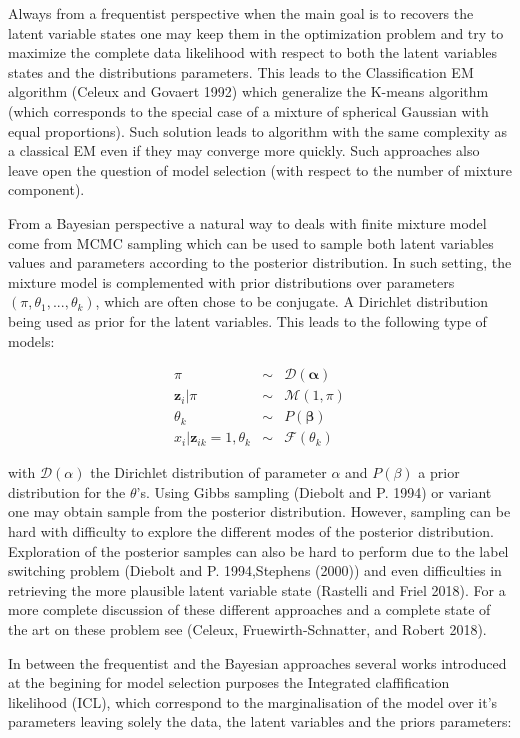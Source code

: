 \documentclass[]{article}
\begin{document}
Always from a frequentist perspective when the main goal is to recovers
the latent variable states one may keep them in the optimization problem
and try to maximize the complete data likelihood with respect to both
the latent variables states and the distributions parameters. This leads
to the Classification EM algorithm (Celeux and Govaert 1992) which
generalize the K-means algorithm (which corresponds to the special case
of a mixture of spherical Gaussian with equal proportions). Such
solution leads to algorithm with the same complexity as a classical EM
even if they may converge more quickly. Such approaches also leave open
the question of model selection (with respect to the number of mixture
component).

From a Bayesian perspective a natural way to deals with finite mixture
model come from MCMC sampling which can be used to sample both latent
variables values and parameters according to the posterior distribution.
In such setting, the mixture model is complemented with prior
distributions over parameters \((\pi,\theta_1,...,\theta_k)\), which are
often chose to be conjugate. A Dirichlet distribution being used as
prior for the latent variables. This leads to the following type of
models:

\[
\begin{eqnarray}
\pi&\sim& \mathcal{D}(\mathbf{\alpha})\\
\mathbf{z}_i|\pi&\sim& \mathcal{M}(1,\pi)\\
\theta_{k}&\sim& P(\mathbf{\beta})\\
x_i|\mathbf{z}_{ik}=1,\theta_k&\sim& \mathcal{F}(\theta_{k})
\end{eqnarray}
\]

with \(\mathcal{D}(\alpha)\) the Dirichlet distribution of parameter
\(\alpha\) and \(P(\beta)\) a prior distribution for the \(\theta\)'s.
Using Gibbs sampling (Diebolt and P. 1994) or variant one may obtain
sample from the posterior distribution. However, sampling can be hard
with difficulty to explore the different modes of the posterior
distribution. Exploration of the posterior samples can also be hard to
perform due to the label switching problem (Diebolt and P. 1994,Stephens
(2000)) and even difficulties in retrieving the more plausible latent
variable state (Rastelli and Friel 2018). For a more complete discussion
of these different approaches and a complete state of the art on these
problem see (Celeux, Fruewirth-Schnatter, and Robert 2018).

In between the frequentist and the Bayesian approaches several works
introduced at the begining for model selection purposes the Integrated
claffification likelihood (ICL), which correspond to the marginalisation
of the model over it's parameters leaving solely the data, the latent
variables and the priors parameters:
\end{document}
